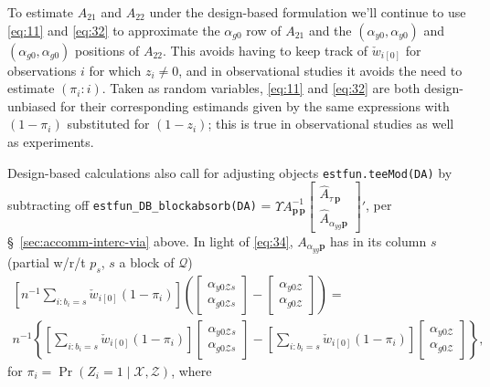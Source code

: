 \documentclass{article}
\newcommand{\owt}[1][{[z_{i}]}]{\ensuremath{\check{w}_{i#1}}}
\newcommand{\AbsorbInterceptsEF}{\Upsilon}
\begin{document}
To estimate $A_{21}$ and $A_{22}$ under the design-based formulation
we'll continue to use \eqref{eq:11} and \eqref{eq:32} to approximate
the $\alpha_{g0}$ row of $A_{21}$ and the  $(\alpha_{y0}, \alpha_{y0})$ and $(\alpha_{g0}, \alpha_{g0})$ positions of $A_{22}$. This avoids having to keep track of
$\owt[{[0]}]$ for observations $i$ for which $z_{i}\neq 0$, and in
observational studies it avoids the 
need to estimate $(\pi_{i}: i)$.  Taken as random variables,
\eqref{eq:11} and \eqref{eq:32} are
both design-unbiased for their corresponding estimands given by
the same expressions with $(1-\pi_{i})$ substituted for $(1-z_{i})$; this
is true in observational studies as well as experiments.

Design-based calculations also call for adjusting objects \texttt{estfun.teeMod(DA)} by subtracting off
\texttt{estfun\_DB\_blockabsorb(DA)} = $\AbsorbInterceptsEF{}
  A_{\mathbf{p}\,\mathbf{p}}^{-1}\left[\begin{smallmatrix}\hat{A}_{\tau\,\mathbf{p}}\\ \hat{A}_{\alpha_{yg}\mathbf{p}}\end{smallmatrix}\right]'$, per \S~\ref{sec:accomm-interc-via}
  above. In light of \eqref{eq:34}, 
  $A_{\alpha_{yg}\mathbf{p}}$ has in
  its column $s$ (partial w/r/t $p_{s}$, $s$ a block of $\mathcal{Q}$)
  \begin{multline}\label{eq:33}
  \left[n^{-1}\sum_{i: b_{i}=s}\owt[{[0]}]
    (1-\pi_{i})\right](\begin{bmatrix} \alpha_{y0\mathcal{Z}s}\\ \alpha_{g0\mathcal{Z}s}  \end{bmatrix} -
  \begin{bmatrix} \alpha_{y0\mathcal{Z}}\\ \alpha_{g0\mathcal{Z}}  \end{bmatrix}) =\\ n^{-1}\left\{\left[\sum_{i: b_{i}=s}\owt[{[0]}]
    (1-\pi_{i})\right]\begin{bmatrix} \alpha_{y0\mathcal{Z}s}\\ \alpha_{g0\mathcal{Z}s}  \end{bmatrix} - \left[\sum_{i: b_{i}=s}\owt[{[0]}]
    (1-\pi_{i})\right]\begin{bmatrix} \alpha_{y0\mathcal{Z}}\\ \alpha_{g0\mathcal{Z}}  \end{bmatrix}\right\}, 
  \end{multline}
  for $\pi_{i} = \operatorname{Pr}(Z_{i}=1 \mid \mathcal{X}, \mathcal{Z})$, where
\end{document}
